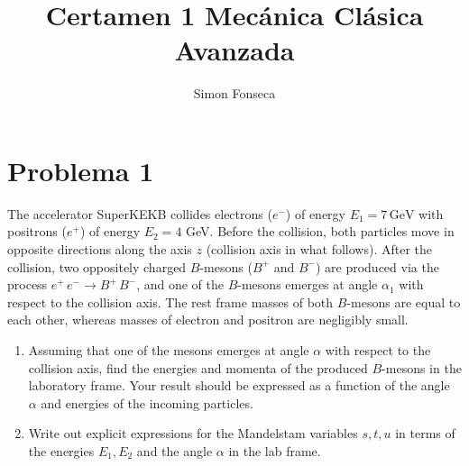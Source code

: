 \documentclass[]{article}
\title{Certamen 1 Mecánica Clásica Avanzada}
\author{Simon Fonseca}
\numberwithin{equation}{section}
\newcommand{\0}{\textcolor{gray}{0}}
\newcommand{\GeV}{\,\text{GeV}}
\begin{document}
\maketitle

\section{Problema 1}
The accelerator SuperKEKB collides electrons (\(e^{-}\)) of energy \(E_{1} = 7 \GeV\) with positrons (\(e^{+}\)) of energy \(E_{2} = 4\) GeV. Before the collision, both particles move in opposite directions along the axis \(z\) (collision axis in what follows). After the collision, two oppositely charged \(B\)-mesons (\(B^{+}\) and \(B^{-}\)) are produced via the process \(e^{+}\, e^{-} \rightarrow B^{+}\, B^{-}\), and one of the \(B\)-mesons emerges at angle \(\alpha_{1}\) with respect to the collision axis. The rest frame masses of both \(B\)-mesons are equal to each other, whereas masses of electron and positron are negligibly small.
\begin{enumerate}
	\item[a)] Assuming that one of the mesons emerges at angle \(\alpha\) with respect to the collision axis, find the energies and momenta of the produced \(B\)-mesons in the laboratory frame. Your result should be expressed
	as a function of the angle \(\alpha\) and energies of the incoming particles.
	
	\item[b)] Write out explicit expressions for the Mandelstam variables \(s, t, u\) in terms of the energies \(E_{1}, E_{2}\) and the angle \(\alpha\) in the lab frame.
\end{enumerate}
\end{document}
